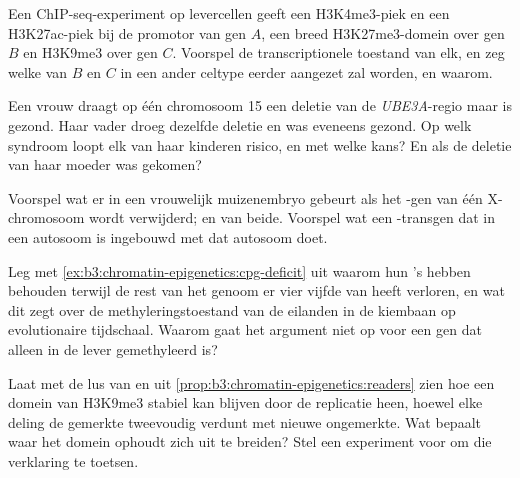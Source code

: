 \begin{exercise}[$\star\star$]\label{exo:b3:chromatin-epigenetics:7}
Een ChIP-seq-experiment op levercellen geeft een H3K4me3-piek en een
H3K27ac-piek bij de promotor van gen $A$, een breed H3K27me3-domein
over gen $B$ en H3K9me3 over gen $C$. Voorspel de transcriptionele
toestand van elk, en zeg welke van $B$ en $C$ in een ander celtype
eerder aangezet zal worden, en waarom.
\end{exercise}

\begin{exercise}[$\star\star$]\label{exo:b3:chromatin-epigenetics:8}
Een vrouw draagt op één chromosoom 15 een deletie van de
\emph{UBE3A}-regio maar is gezond. Haar vader droeg dezelfde deletie
en was eveneens gezond. Op welk syndroom loopt elk van haar kinderen
risico, en met welke kans? En als de deletie van haar moeder was
gekomen?
\end{exercise}

\begin{exercise}[$\star\star$]\label{exo:b3:chromatin-epigenetics:9}
Voorspel wat er in een vrouwelijk muizenembryo gebeurt als het
\emph{}-gen van één X-chromosoom wordt verwijderd; en van beide.
Voorspel wat een \emph{}-transgen dat in een autosoom is ingebouwd
met dat autosoom doet.
\end{exercise}

\begin{exercise}[$\star\star\star$]\label{exo:b3:chromatin-epigenetics:10}
Leg met \cref{ex:b3:chromatin-epigenetics:cpg-deficit} uit waarom
 hun 's hebben behouden terwijl de rest van het genoom
er vier vijfde van heeft verloren, en wat dit zegt over de
methyleringstoestand van de eilanden in de kiembaan op evolutionaire
tijdschaal. Waarom gaat het argument niet op voor een gen dat alleen
in de lever gemethyleerd is?
\end{exercise}

\begin{exercise}[$\star\star\star$]\label{exo:b3:chromatin-epigenetics:11}
Laat met de lus van  en  uit
\cref{prop:b3:chromatin-epigenetics:readers} zien hoe een domein van
H3K9me3 stabiel kan blijven door de replicatie heen, hoewel elke
deling de gemerkte  tweevoudig verdunt met nieuwe ongemerkte.
Wat bepaalt waar het domein ophoudt zich uit te breiden? Stel een
experiment voor om die verklaring te toetsen.
\end{exercise}

